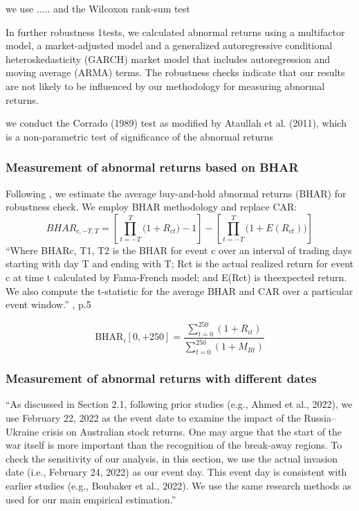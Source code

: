 \documentclass[12pt,a4paper]{article}
\begin{document}
we use ..... and the Wilcoxon rank-sum test \citep[p.~8]{kiesel_should_2023}

In further robustness 1tests, we calculated abnormal returns using a multifactor model, a market-adjusted model and a generalized autoregressive conditional heteroskedasticity (GARCH) market model that includes autoregression and moving average (ARMA) terms. The robustness checks indicate that our results are not likely to be influenced by our methodology for measuring abnormal returns.\citep[p.~8]{kiesel_should_2023}

we conduct the Corrado (1989) test as modified by Ataullah et al. (2011), which is a non-parametric test of significance of the abnormal returns \citep[p.~10]{kumari_are_2023}

\subsubsection{Measurement of abnormal returns based on BHAR}
Following \citep{gu_how_2021}, we estimate the average buy-and-hold abnormal returns (BHAR) for robustness check. We employ BHAR methodology and replace CAR:
\begin{equation}
BHAR_{c,-T,T} = 
\left[ \prod_{t=-T}^{T} \bigl(1 + R_{ct}\bigr) -1 \right] -
\left[ \prod_{t=-T}^{T} \bigl(1 + E(R_{ct})\bigr) \right]
\end{equation}
“Where BHARc, T1, T2 is the BHAR for event c over an interval of trading days starting with day T and ending with T; Rct is the actual realized return for event c at time t calculated by Fama-French model; and E(Rct) is theexpected return. We also compute the t-statistic for the average BHAR and CAR over a particular event window.” \citep{gu_how_2021}, p.5

\begin{equation}
\text{BHAR}_{i}[0, +250] = 
\frac{\sum_{t=0}^{250} (1 + R_{it})}{\sum_{t=0}^{250} (1 + M_{Rt})}
\end{equation}
\citep[p.~6]{xu_trade_2021}

\subsubsection{Measurement of abnormal returns with different dates}
“As discussed in Section 2.1, following prior studies (e.g., Ahmed et al., 2022), we use February 22, 2022 as the event date to examine the impact of the Russia–Ukraine crisis on Australian stock returns. One may argue that the start of the war itself is more important than the recognition of the break-away regions. To check the sensitivity of our analysis, in this section, we use the actual invasion date (i.e., February 24, 2022) as our event day. This event day is consistent with earlier studies (e.g., Boubaker et al., 2022). We use the same research methods as used for our main empirical estimation.” \citep[p,~15]{kamal_impact_2023}
\end{document}
